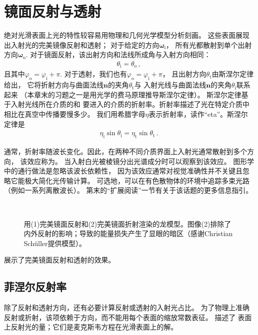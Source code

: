 \section{镜面反射与透射}\label{sec:镜面反射与透射}

绝对光滑表面上光的特性较容易用物理和几何光学模型分析刻画。
这些表面展现出入射光的完美镜像反射和透射；
对于给定的方向${\bm\omega}_{\mathrm{i}}$，
所有光都散射到单个出射方向${\bm\omega}_{\mathrm{o}}$.
对于镜面反射，该出射方向和法线所成角与入射方向相同：
\begin{align*}
    \theta_{\mathrm{i}}=\theta_{\mathrm{o}}\, ,
\end{align*}
且其中$\varphi_{\mathrm{o}}=\varphi_{\mathrm{i}}+\pi$.
对于透射，我们也有$\varphi_{\mathrm{o}}=\varphi_{\mathrm{i}}+\pi$，
且出射方向$\theta_{\mathrm{t}}$由斯涅尔定律给出，
它将折射方向与曲面法线$\bm n$的夹角$\theta_{\mathrm{t}}$与
入射光线与曲面法线$\bm n$的夹角$\theta_{\mathrm{i}}$联系起来
（本章末的习题之一是用光学的费马原理推导斯涅尔定律）。
斯涅尔定律基于入射光线所在介质的和
要进入的介质的折射率。折射率描述了光在特定介质中相比在真空中传播要慢多少。
我们用希腊字母$\eta$表示折射率，读作“eta”。斯涅尔定律是
\begin{align}
    \label{eq:8.2}
    \eta_{\mathrm{i}}\sin\theta_{\mathrm{i}}=\eta_{\mathrm{t}}\sin\theta_{\mathrm{t}}\, .
\end{align}

通常，折射率随波长变化。因此，在两种不同介质界面上入射光通常散射到多个方向，
该效应称为。
当入射白光被棱镜分出光谱成分时可以观察到该效应。
图形学中的通行做法是忽略该波长依赖性，
因为该效应通常对视觉准确性并不关键且忽略它能极大简化光传输计算。
可选地，可以在有色散物体的环境中追踪多束光路（例如一系列离散波长）。
第末的“扩展阅读”一节有关于该话题的更多信息指引。
\begin{figure}[htbp]
    \centering
    \\
    \caption{用(1)完美镜面反射和(2)完美镜面折射渲染的龙模型。图像(2)排除了
        内外反射的影响；导致的能量损失产生了显眼的暗区（感谢Christian Schüller提供模型）。}
    \label{fig:8.4}
\end{figure}

展示了完美镜面反射和透射的效果。

\subsection{菲涅尔反射率}\label{sub:菲涅尔反射率}
除了反射和透射方向，还有必要计算反射或透射的入射光占比。
为了物理上准确反射或折射，该项依赖于方向，而不能用每个表面的缩放常数表征。
描述了
表面上反射光的量；它们是麦克斯韦方程在光滑表面上的解。

